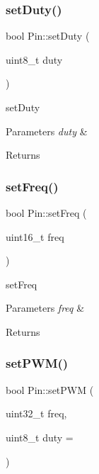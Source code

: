 \subsubsection{\texorpdfstring{set\+Duty()}{setDuty()}}
{\footnotesize\ttfamily bool Pin\+::set\+Duty (\begin{DoxyParamCaption}\item[{uint8\+\_\+t}]{duty }\end{DoxyParamCaption})}



set\+Duty 


\begin{DoxyParams}{Parameters}
{\em duty} & \\
\hline
\end{DoxyParams}
\begin{DoxyReturn}{Returns}

\end{DoxyReturn}
\mbox{\label{classPin_a8610548d2ab0b531e4e0697ca09aeb0c}} 
\subsubsection{\texorpdfstring{set\+Freq()}{setFreq()}}
{\footnotesize\ttfamily bool Pin\+::set\+Freq (\begin{DoxyParamCaption}\item[{uint16\+\_\+t}]{freq }\end{DoxyParamCaption})}



set\+Freq 


\begin{DoxyParams}{Parameters}
{\em freq} & \\
\hline
\end{DoxyParams}
\begin{DoxyReturn}{Returns}

\end{DoxyReturn}
\mbox{\label{classPin_ae3b0862a7ec9b11f7a8986024669e25a}} 
\subsubsection{\texorpdfstring{set\+P\+W\+M()}{setPWM()}}
{\footnotesize\ttfamily bool Pin\+::set\+P\+WM (\begin{DoxyParamCaption}\item[{uint32\+\_\+t}]{freq,  }\item[{uint8\+\_\+t}]{duty = {} }\end{DoxyParamCaption})}



